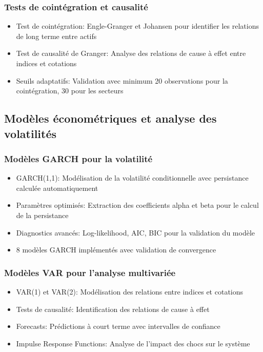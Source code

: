 \subsubsection{Tests de cointégration et causalité}
\begin{itemize}
    \item Test de cointégration: Engle-Granger et Johansen pour identifier les relations de long terme entre actifs
    \item Test de causalité de Granger: Analyse des relations de cause à effet entre indices et cotations
    \item Seuils adaptatifs: Validation avec minimum 20 observations pour la cointégration, 30 pour les secteurs
\end{itemize}

\subsection{Modèles économétriques et analyse des volatilités}
\subsubsection{Modèles GARCH pour la volatilité}
\begin{itemize}
    \item GARCH(1,1): Modélisation de la volatilité conditionnelle avec persistance calculée automatiquement
    \item Paramètres optimisés: Extraction des coefficients alpha et beta pour le calcul de la persistance
    \item Diagnostics avancés: Log-likelihood, AIC, BIC pour la validation du modèle
    \item 8 modèles GARCH implémentés avec validation de convergence
\end{itemize}

\subsubsection{Modèles VAR pour l'analyse multivariée}
\begin{itemize}
    \item VAR(1) et VAR(2): Modélisation des relations entre indices et cotations
    \item Tests de causalité: Identification des relations de cause à effet
    \item Forecasts: Prédictions à court terme avec intervalles de confiance
    \item Impulse Response Functions: Analyse de l'impact des chocs sur le système
\end{itemize}


